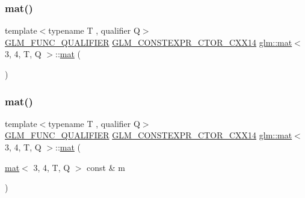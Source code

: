 \subsubsection{\texorpdfstring{mat()}{mat()}\hspace{0.1cm}{\footnotesize\ttfamily [1/21]}}
{\footnotesize\ttfamily template$<$typename T , qualifier Q$>$ \\
\hyperlink{setup_8hpp_a33fdea6f91c5f834105f7415e2a64407}{G\+L\+M\+\_\+\+F\+U\+N\+C\+\_\+\+Q\+U\+A\+L\+I\+F\+I\+ER} \hyperlink{setup_8hpp_a0900f9145e68bf6061b6f5e7be3fa751}{G\+L\+M\+\_\+\+C\+O\+N\+S\+T\+E\+X\+P\+R\+\_\+\+C\+T\+O\+R\+\_\+\+C\+X\+X14} \hyperlink{structglm_1_1mat}{glm\+::mat}$<$ 3, 4, T, Q $>$\+::\hyperlink{structglm_1_1mat}{mat} (\begin{DoxyParamCaption}{ }\end{DoxyParamCaption})}

\mbox{\label{structglm_1_1mat_3_013_00_014_00_01_t_00_01_q_01_4_a7c4d69ea49d8271382c7d08e14c16a25}} 
\subsubsection{\texorpdfstring{mat()}{mat()}\hspace{0.1cm}{\footnotesize\ttfamily [2/21]}}
{\footnotesize\ttfamily template$<$typename T , qualifier Q$>$ \\
\hyperlink{setup_8hpp_a33fdea6f91c5f834105f7415e2a64407}{G\+L\+M\+\_\+\+F\+U\+N\+C\+\_\+\+Q\+U\+A\+L\+I\+F\+I\+ER} \hyperlink{setup_8hpp_a0900f9145e68bf6061b6f5e7be3fa751}{G\+L\+M\+\_\+\+C\+O\+N\+S\+T\+E\+X\+P\+R\+\_\+\+C\+T\+O\+R\+\_\+\+C\+X\+X14} \hyperlink{structglm_1_1mat}{glm\+::mat}$<$ 3, 4, T, Q $>$\+::\hyperlink{structglm_1_1mat}{mat} (\begin{DoxyParamCaption}\item[{\hyperlink{structglm_1_1mat}{mat}$<$ 3, 4, T, Q $>$ const \&}]{m }\end{DoxyParamCaption})}

\mbox{\label{structglm_1_1mat_3_013_00_014_00_01_t_00_01_q_01_4_a04c8fa43e36e082b099a3c7603ad8453}} 
